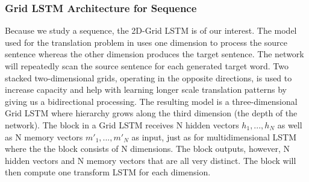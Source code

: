 \documentclass{article} %
\begin{document}
\subsubsection{Grid LSTM Architecture for Sequence}
 Because we study a sequence, the 2D-Grid LSTM is of our interest. The model used for the translation problem in \cite{Kalchbrenner} uses one dimension to process the source sentence whereas the other dimension produces the target sentence. The network will repeatedly scan the source sentence for each generated target word. Two stacked two-dimensional grids, operating in the opposite directions, is used to increase capacity and help with learning longer scale translation patterns by giving us a bidirectional processing. The resulting model is a three-dimensional Grid LSTM where hierarchy grows along the third dimension (the depth of the network). The block in a Grid LSTM receives N hidden vectors $h_1, ..., h_N$ as well as N memory vectors $m'_1, ..., m'_N$ as input, just as for multidimensional LSTM where the the block consists of N dimensions. The block outputs, however, N hidden vectors and N memory vectors that are all very distinct. The block will then compute one transform LSTM for each dimension. 




\end{document}
